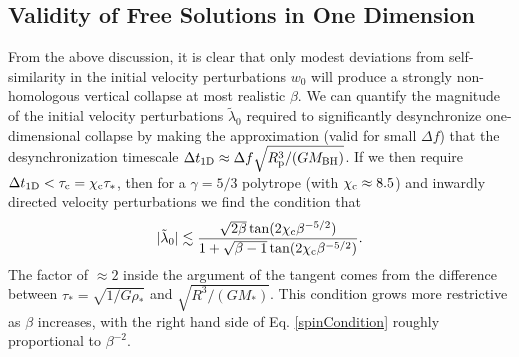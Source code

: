 \documentclass[useAMS, twocolumn, usenatbib]{mn2e}
\begin{document}
\subsection{Validity of Free Solutions in One Dimension}

From the above discussion, it is clear that only modest deviations from self-similarity in the initial velocity perturbations $w_0$ will produce a strongly non-homologous vertical collapse at most realistic $\beta$.  We can quantify the magnitude of the initial velocity perturbations $\tilde{\lambda}_0$ required to significantly desynchronize one-dimensional collapse by making the approximation (valid for small $\Delta f$) that the desynchronization timescale $\Delta t_{\rm 1D}\approx \Delta f \sqrt{R_{\rm p}^3/(GM_{\rm BH})}$.  If we then require $\Delta t_{\rm 1D}<\tau_{\rm c}= \chi_{\rm c} \tau_*$, then for a $\gamma=5/3$ polytrope (with $\chi_{\rm c}\approx 8.5$) and inwardly directed velocity perturbations we find the condition that 
\begin{equation}
|\tilde{\lambda}_0|\lesssim \frac{\sqrt{2\beta}\tan(2\chi_{\rm c} \beta^{-5/2})}{1+\sqrt{\beta-1} \tan(2\chi_{\rm c}\beta^{-5/2})}. \label{spinCondition}
\end{equation}
The factor of $\approx 2$ inside the argument of the tangent comes from the difference between $\tau_*=\sqrt{1/G\rho_*}$ and $\sqrt{R^3/(GM_*)}$.  This condition grows more restrictive as $\beta$ increases, with the right hand side of Eq. \ref{spinCondition} roughly proportional to $\beta^{-2}$.
\end{document}

